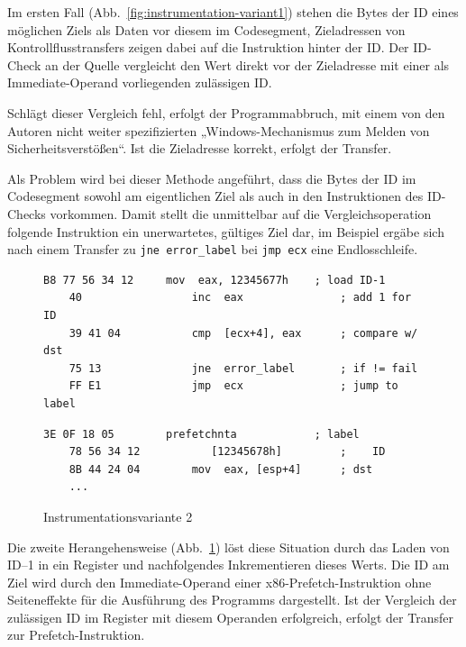 \documentclass[11pt]{article}
\begin{document}
Im ersten Fall (Abb.~\ref{fig:instrumentation-variant1}) stehen die Bytes der ID
eines möglichen Ziels als Daten vor diesem im Codesegment, Zieladressen von
Kontrollflusstransfers zeigen dabei auf die Instruktion hinter der ID. Der
ID-Check an der Quelle vergleicht den Wert direkt vor der Zieladresse mit einer
als Immediate-Operand vorliegenden zulässigen ID.

Schlägt dieser Vergleich fehl, erfolgt der Programmabbruch, mit einem von den
Autoren nicht weiter spezifizierten „Windows-Mechanismus zum Melden von
Sicherheitsverstößen“. Ist die Zieladresse korrekt, erfolgt der Transfer.

\label{instrumentation-variant1}

Als Problem wird bei dieser Methode angeführt,
dass die Bytes der ID im Codesegment sowohl am eigentlichen Ziel als auch in
den Instruktionen des ID-Checks vorkommen. Damit stellt die unmittelbar auf die
Vergleichsoperation folgende Instruktion ein unerwartetes, gültiges Ziel dar,
im Beispiel ergäbe sich nach einem Transfer zu \texttt{jne error\_label} bei
\texttt{jmp ecx} eine Endlosschleife.

\begin{figure}
  \begin{lstlisting}[title=Quelle]
    B8 77 56 34 12     mov  eax, 12345677h    ; load ID-1
    40                 inc  eax               ; add 1 for ID
    39 41 04           cmp  [ecx+4], eax      ; compare w/ dst
    75 13              jne  error_label       ; if != fail
    FF E1              jmp  ecx               ; jump to label
  \end{lstlisting}

  \begin{lstlisting}[title=Ziel]
    3E 0F 18 05        prefetchnta            ; label
    78 56 34 12           [12345678h]         ;    ID
    8B 44 24 04        mov  eax, [esp+4]      ; dst
    ...
  \end{lstlisting}

  \caption{Instrumentationsvariante 2}
  \label{fig:instrumentation-variant2}
\end{figure}

\label{instrumentation-variant2}

Die zweite Herangehensweise (Abb.~\ref{fig:instrumentation-variant2}) löst diese
Situation durch das Laden von ID–1 in ein Register und nachfolgendes
Inkrementieren dieses Werts. Die ID am Ziel wird durch den Immediate-Operand
einer x86-Prefetch-Instruktion ohne Seiteneffekte für die Ausführung des
Programms dargestellt. Ist der Vergleich der zulässigen ID im Register mit
diesem Operanden erfolgreich, erfolgt der Transfer zur Prefetch-Instruktion.
\end{document}

